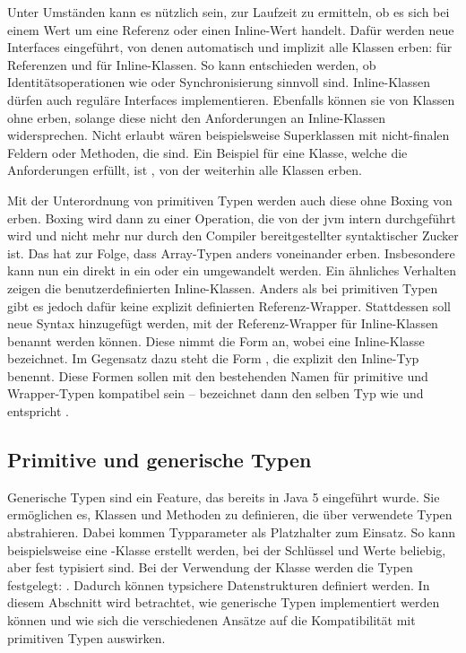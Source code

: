 Unter Umständen kann es nützlich sein, zur Laufzeit zu ermitteln, ob es sich bei einem Wert um eine Referenz oder einen Inline-Wert handelt.
Dafür werden neue Interfaces eingeführt, von denen automatisch und implizit alle Klassen erben:
 für Referenzen und  für Inline-Klassen.
So kann entschieden werden, ob Identitätsoperationen wie \code{==} oder Synchronisierung sinnvoll sind.
Inline-Klassen dürfen auch reguläre Interfaces implementieren.
Ebenfalls können sie von Klassen ohne  erben, solange diese nicht den Anforderungen an Inline-Klassen widersprechen.
Nicht erlaubt wären beispielsweise Superklassen mit nicht-finalen Feldern oder Methoden, die  sind.
Ein Beispiel für eine Klasse, welche die Anforderungen erfüllt, ist , von der weiterhin alle Klassen erben.

Mit der Unterordnung von primitiven Typen werden auch diese ohne Boxing von  erben.
Boxing wird dann zu einer Operation, die von der \ac{jvm} intern durchgeführt wird und nicht mehr nur durch den Compiler bereitgestellter syntaktischer Zucker ist.
Das hat zur Folge, dass Array-Typen anders voneinander erben.
Insbesondere kann nun ein  direkt in ein  oder ein  umgewandelt werden.
Ein ähnliches Verhalten zeigen die benutzerdefinierten Inline-Klassen.
Anders als bei primitiven Typen gibt es jedoch dafür keine explizit definierten Referenz-Wrapper.
Stattdessen soll neue Syntax hinzugefügt werden, mit der Referenz-Wrapper für Inline-Klassen benannt werden können.
Diese nimmt die Form  an, wobei  eine Inline-Klasse bezeichnet.
Im Gegensatz dazu steht die Form , die explizit den Inline-Typ benennt.
Diese Formen sollen mit den bestehenden Namen für primitive und Wrapper-Typen kompatibel sein --  bezeichnet dann den selben Typ wie  und  entspricht .

\subsection{Primitive und generische Typen}\label{subsec:primitive-generics}

Generische Typen sind ein Feature, das bereits in Java 5 eingeführt wurde.
Sie ermöglichen es, Klassen und Methoden zu definieren, die über verwendete Typen abstrahieren.
Dabei kommen Typparameter als Platzhalter zum Einsatz.
So kann beispielsweise eine -Klasse erstellt werden, bei der Schlüssel und Werte beliebig, aber fest typisiert sind.
Bei der Verwendung der Klasse werden die Typen festgelegt: .
Dadurch können typsichere Datenstrukturen definiert werden.
In diesem Abschnitt wird betrachtet, wie generische Typen implementiert werden können und wie sich die verschiedenen Ansätze auf die Kompatibilität mit primitiven Typen auswirken.

